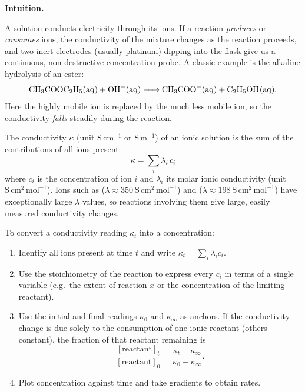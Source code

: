 \documentclass[11pt]{article}
\newcommand{\cle}[1]{{\popxbold\color{popdark}#1}}
\newcounter{popsec}
\newcounter{popsub}
\newcommand{\courssub}[1]{%
  \stepcounter{popsub}%
  \par\vspace{9pt}\noindent{\popxbold\fontsize{11.5}{13}\selectfont\color{popink}{\color{poporange}\thepopsec.\thepopsub}\hspace{6pt}#1}\par\nopagebreak\vspace{4pt}
}
\begin{document}
\courssub{Conductimetry}

\textbf{Intuition.}\par
A solution conducts electricity through its ions. If a reaction \emph{produces} or \emph{consumes} ions, the conductivity of the mixture changes as the reaction proceeds, and two inert electrodes (usually platinum) dipping into the flask give us a continuous, non-destructive concentration probe. A classic example is the alkaline hydrolysis of an ester:
\[
\ce{CH3COOC2H5(aq) + OH^{-}(aq) -> CH3COO^{-}(aq) + C2H5OH(aq)}.
\]
Here the highly mobile  ion is replaced by the much less mobile  ion, so the conductivity \emph{falls} steadily during the reaction.

\begin{definition}
The \cle{conductivity} $\kappa$ (unit $\mathrm{S\,cm^{-1}}$ or $\mathrm{S\,m^{-1}}$) of an ionic solution is the sum of the contributions of all ions present:
\[
\kappa = \sum_i \lambda_i\, c_i
\]
where $c_i$ is the concentration of ion $i$ and $\lambda_i$ its \cle{molar ionic conductivity} (unit $\mathrm{S\,cm^2\,mol^{-1}}$). Ions such as  ($\lambda \approx 350\ \mathrm{S\,cm^2\,mol^{-1}}$) and  ($\lambda \approx 198\ \mathrm{S\,cm^2\,mol^{-1}}$) have exceptionally large $\lambda$ values, so reactions involving them give large, easily measured conductivity changes.
\end{definition}

\begin{methode}
To convert a conductivity reading $\kappa_t$ into a concentration:
\begin{enumerate}
\item Identify all ions present at time $t$ and write $\kappa_t = \sum_i \lambda_i c_i$.
\item Use the stoichiometry of the reaction to express every $c_i$ in terms of a single variable (e.g.\ the extent of reaction $x$ or the concentration of the limiting reactant).
\item Use the initial and final readings $\kappa_0$ and $\kappa_\infty$ as anchors. If the conductivity change is due solely to the consumption of one ionic reactant (others constant), the fraction of that reactant remaining is
\[
\frac{[\text{reactant}]_t}{[\text{reactant}]_0} = \frac{\kappa_t - \kappa_\infty}{\kappa_0 - \kappa_\infty}.
\]
\item Plot concentration against time and take gradients to obtain rates.
\end{enumerate}
\end{methode}
\end{document}
